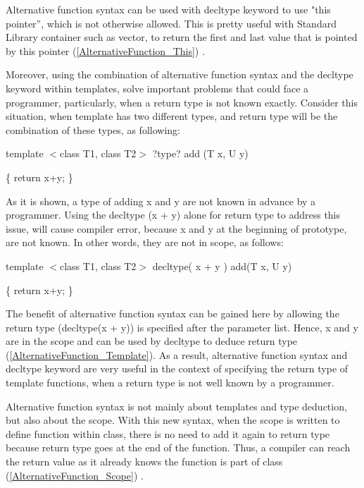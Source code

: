\documentclass[11pt]{report}
\begin{document}
Alternative function syntax can be used with decltype keyword to use "this pointer”, which is not otherwise allowed. This is pretty useful with Standard Library container such as vector, to return the first and last value that is pointed by this pointer (\ref{AlternativeFunction_This}) \cite{ISO:2011:Cpplanguage}. 


Moreover, using the combination of alternative function syntax and the decltype keyword within templates, solve important problems that could face a programmer, particularly, when a return type is not known exactly.  Consider this situation, when template has two different types, and return type will be the combination of these types, as following:
\begin{center}
template $<$class T1, class T2$>$  ?type? add (T x, U y) 


\{ return x+y; \}
\end{center}

As it is shown, a type of adding x and y are not known in advance by a programmer. Using the decltype (x + y) alone for return type to address this issue, will cause compiler error, because x and y at the beginning of prototype, are not known.  In other words, they are not in scope, as follows:

\begin{center}
template $<$class T1, class T2$>$  decltype( x + y ) add(T x, U y)


\{ return x+y; \}
\end{center}

The benefit of alternative function syntax can be gained here by allowing the return type (decltype(x + y)) is specified after the parameter list. Hence, x and y are in the scope and can be used by decltype to deduce return type (\ref{AlternativeFunction_Template}). As a result, alternative function syntax and decltype keyword are very useful in the context of specifying the return type of template functions, when a return type is not well known by a programmer\cite{Prata:2012:Cpp}.


Alternative function syntax is not mainly about templates and type deduction, but also about the scope.  With this new syntax, when the scope is written to define function within class, there is no need to add it again to return type because return type goes at the end of the function. Thus, a compiler can reach the return value as it already knows the function is part of class (\ref{AlternativeFunction_Scope}) \cite{Allain:2011:FutureCpp}.
\end{document}
